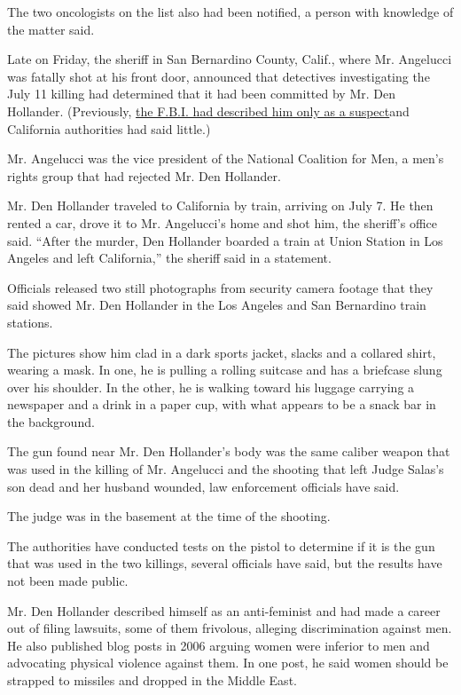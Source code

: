 The two oncologists on the list also had been notified, a person with
knowledge of the matter said.

Late on Friday, the sheriff in San Bernardino County, Calif., where Mr.
Angelucci was fatally shot at his front door, announced that detectives
investigating the July 11 killing had determined that it had been
committed by Mr. Den Hollander. (Previously,
\href{https://www.nytimes3xbfgragh.onion/2020/07/22/nyregion/roy-den-hollander-esther-salas.html}{the
F.B.I. had described him only as a suspect}and California authorities
had said little.)

Mr. Angelucci was the vice president of the National Coalition for Men,
a men's rights group that had rejected Mr. Den Hollander.

Mr. Den Hollander traveled to California by train, arriving on July 7.
He then rented a car, drove it to Mr. Angelucci's home and shot him, the
sheriff's office said. ``After the murder, Den Hollander boarded a train
at Union Station in Los Angeles and left California,'' the sheriff said
in a statement.

Officials released two still photographs from security camera footage
that they said showed Mr. Den Hollander in the Los Angeles and San
Bernardino train stations.

The pictures show him clad in a dark sports jacket, slacks and a
collared shirt, wearing a mask. In one, he is pulling a rolling suitcase
and has a briefcase slung over his shoulder. In the other, he is walking
toward his luggage carrying a newspaper and a drink in a paper cup, with
what appears to be a snack bar in the background.

The gun found near Mr. Den Hollander's body was the same caliber weapon
that was used in the killing of Mr. Angelucci and the shooting that left
Judge Salas's son dead and her husband wounded, law enforcement
officials have said.

The judge was in the basement at the time of the shooting.

The authorities have conducted tests on the pistol to determine if it is
the gun that was used in the two killings, several officials have said,
but the results have not been made public.

Mr. Den Hollander described himself as an anti-feminist and had made a
career out of filing lawsuits, some of them frivolous, alleging
discrimination against men. He also published blog posts in 2006 arguing
women were inferior to men and advocating physical violence against
them. In one post, he said women should be strapped to missiles and
dropped in the Middle East.

